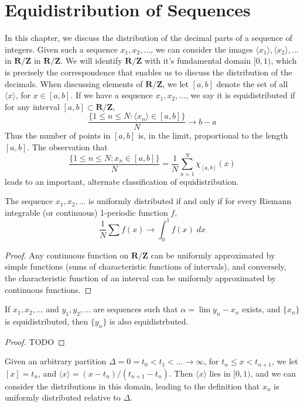 \chapter{Equidistribution of Sequences}

In this chapter, we discuss the distribution of the decimal parts of a sequence of integers. Given such a sequence $x_1, x_2, \dots$, we can consider the images $\langle x_1 \rangle, \langle x_2 \rangle, \dots$ in $\mathbf{R}/\mathbf{Z}$ in $\mathbf{R}/\mathbf{Z}$. We will identify $\mathbf{R}/\mathbf{Z}$ with it's fundamental domain $[0,1)$, which is precisely the correspondence that enables us to discuss the distribution of the decimals. When discussing elements of $\mathbf{R}/\mathbf{Z}$, we let $[a,b]$ denote the set of all $\langle x \rangle$, for $x \in [a,b]$. If we have a sequence $x_1, x_2, \dots$, we say it is equidistributed if for any interval $[a,b] \subset \mathbf{R}/\mathbf{Z}$,
%
\[ \frac{\{ 1 \leq n \leq N: \langle x_n \rangle \in [a,b] \}}{N} \to b - a \]
%
Thus the number of points in $[a,b]$ is, in the limit, proportional to the length $[a,b]$. The observation that
%
\[ \frac{\{ 1 \leq n \leq N : x_n \in [a,b] \}}{N} = \frac{1}{N} \sum_{n = 1}^N \chi_{[a,b]}(x) \]
%
leads to an important, alternate classification of equidistribution.

\begin{theorem}
    The sequence $x_1, x_2, \dots$ is uniformly distributed if and only if for every Riemann integrable (or continuous) 1-periodic function $f$,
    \[ \frac{1}{N} \sum f(x) \to \int_0^1 f(x)\; dx \]
\end{theorem}
\begin{proof}
    Any continuous function on $\mathbf{R}/\mathbf{Z}$ can be uniformly approximated by simple functions (sums of characteristic functions of intervals), and conversely, the characteristic function of an interval can be uniformly approximated by continuous functions.
\end{proof}

\begin{lemma}
    If $x_1, x_2, \dots$ and $y_1, y_2, \dots$ are sequences such that $\alpha = \lim y_n - x_n$ exists, and $\{ x_n \}$ is equidistributed, then $\{ y_n \}$ is also equidistrbuted.
\end{lemma}
\begin{proof}
    TODO
\end{proof}

Given an arbitrary partition $\Delta = 0 = t_0 < t_1 < \dots \to \infty$, for $t_n \leq x < t_{n+1}$, we let $[x] = t_n$, and $\langle x \rangle = (x - t_n)/(t_{n+1} - t_n)$. Then $\langle x \rangle$ lies in $[0,1)$, and we can consider the distributions in this domain, leading to the definition that $x_n$ is uniformly distributed relative to $\Delta$.

